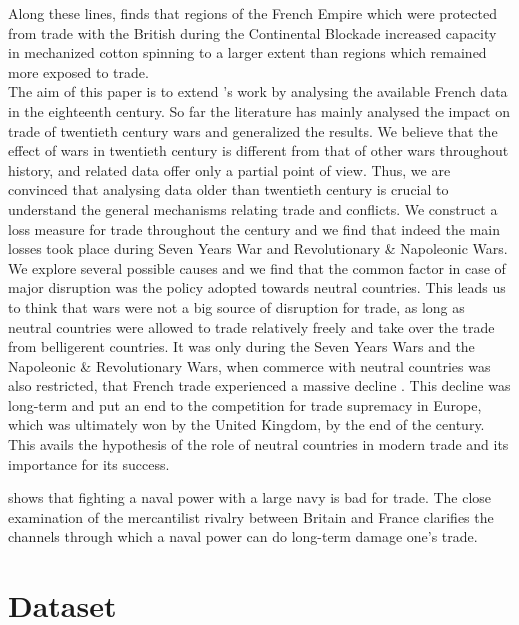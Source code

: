 \documentclass[12pt,a4paper,notitlepage,english]{article}
\begin{document}
Along these lines, \cite{juhasz2014temporary} finds that regions of the French Empire which were protected from trade with the British during the Continental Blockade increased capacity in mechanized cotton spinning to a larger extent than regions which remained more exposed to trade.\\
The aim of this paper is to extend \cite{riley_seven_1986}’s work by analysing the available French data in the eighteenth century.
So far the literature has mainly analysed the impact on trade of twentieth century wars and generalized the results.
We believe that the effect of wars in twentieth century is different from that of other wars throughout history, and related data offer only a partial point of view.
Thus, we are convinced that analysing data older than twentieth century is crucial to understand the general mechanisms relating trade and conflicts.
We construct a loss measure for trade throughout the century and we find that indeed the main losses took place during Seven Years War and Revolutionary \& Napoleonic Wars.
We explore several possible causes and we find that the common factor in case of major disruption was the policy adopted towards neutral countries.
This leads us to think that wars were not a big source of disruption for trade, as long as neutral countries were allowed to trade relatively freely and take over the trade from belligerent countries.
It was only during the Seven Years Wars and the Napoleonic \& Revolutionary Wars, when commerce with neutral countries was also restricted, that French trade experienced a massive decline \citep{findlay2009power}.
This decline was long-term and put an end to the competition for trade supremacy in Europe, which was ultimately won by the United Kingdom, by the end of the century.
This avails the hypothesis of the role of neutral countries in modern trade and its importance for its success.


\cite{rahman2010fighting}  shows that fighting a naval power with a large navy is bad for trade. The close examination of the mercantilist rivalry between Britain and France clarifies the channels through which a naval power can do long-term damage one's trade.



\section{Dataset} \label{dataset}
\end{document}
